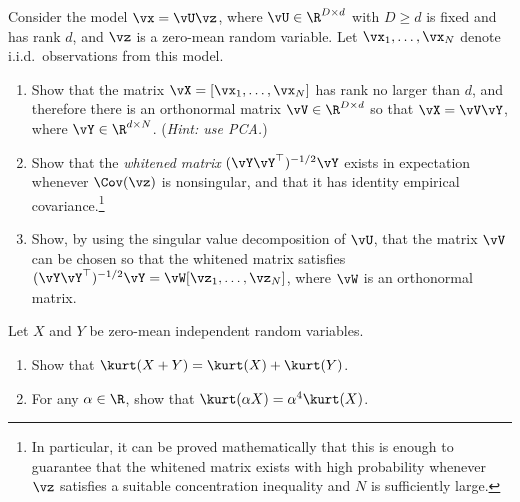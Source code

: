 \documentclass[../../book-main.tex]{subfiles}
\begin{document}
\begin{exercise}\label{exercise:whitening}
    Consider the model $\vx = \vU \vz$, where $\vU \in \R^{D \times
    d}$ with $D \geq d$ is fixed and has rank $d$, and $\vz$ is a
    zero-mean random variable. Let $\vx_1, \dots, \vx_N$ denote
    i.i.d.\ observations from this model.
    \begin{enumerate}
        \item Show that the matrix $\vX = [\vx_1, \dots, \vx_N]$ has
            rank no larger than $d$, and therefore there is an
            orthonormal matrix $\vV \in \R^{D \times d}$ so that $\vX
            = \vV \vY$, where $\vY \in \R^{d \times N}$.
            (\textit{Hint: use PCA.})
        \item Show that the \textit{whitened matrix} $(\vY
            \vY^\top)^{-1/2}\vY$ exists in expectation whenever
            $\Cov(\vz)$ is nonsingular, and that it has identity
            empirical covariance.\footnote{In particular, it can be
                proved mathematically that this is enough to guarantee
                that the whitened matrix exists with high probability
                whenever $\vz$ satisfies a suitable concentration
            inequality and $N$ is sufficiently large.}
        \item Show, by using the singular value decomposition of
            $\vU$, that the matrix $\vV$ can be chosen so that the
            whitened matrix satisfies $(\vY \vY^\top)^{-1/2} \vY =
            \vW [\vz_1, \dots, \vz_N]$, where $\vW$ is an orthonormal matrix.
    \end{enumerate}
\end{exercise}

\begin{exercise}\label{exercise:kurtosis-linearity-properties}
    Let $X$ and $Y$ be zero-mean independent random variables.
    \begin{enumerate}
        \item Show that $\kurt(X + Y) = \kurt(X) + \kurt(Y)$.
        \item For any $\alpha \in \R$, show that $\kurt(\alpha X) =
            \alpha^4 \kurt(X)$.
    \end{enumerate}
\end{exercise}
\end{document}
